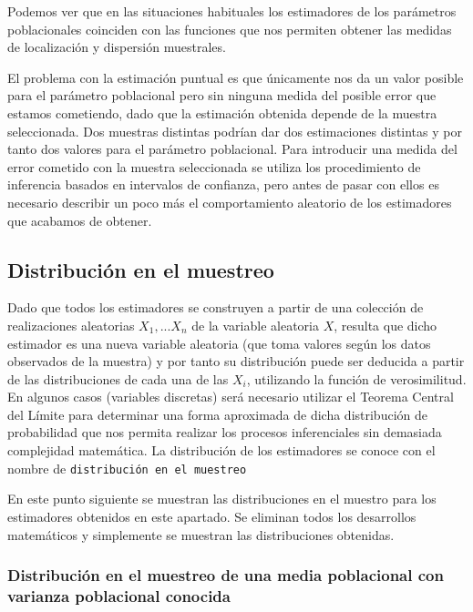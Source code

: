 \documentclass[
]{book}
\begin{document}
Podemos ver que en las situaciones habituales los estimadores de los parámetros poblacionales coinciden con las funciones que nos permiten obtener las medidas de localización y dispersión muestrales.

El problema con la estimación puntual es que únicamente nos da un valor posible para el parámetro poblacional pero sin ninguna medida del posible error que estamos cometiendo, dado que la estimación obtenida depende de la muestra seleccionada. Dos muestras distintas podrían dar dos estimaciones distintas y por tanto dos valores para el parámetro poblacional. Para introducir una medida del error cometido con la muestra seleccionada se utiliza los procedimiento de inferencia basados en intervalos de confianza, pero antes de pasar con ellos es necesario describir un poco más el comportamiento aleatorio de los estimadores que acabamos de obtener.

\hypertarget{distribuciuxf3n-en-el-muestreo}{%
\subsection{Distribución en el muestreo}\label{distribuciuxf3n-en-el-muestreo}}

Dado que todos los estimadores se construyen a partir de una colección de realizaciones aleatorias \(X_1,...X_n\) de la variable aleatoria \(X\), resulta que dicho estimador es una nueva variable aleatoria (que toma valores según los datos observados de la muestra) y por tanto su distribución puede ser deducida a partir de las distribuciones de cada una de las \(X_i\), utilizando la función de verosimilitud. En algunos casos (variables discretas) será necesario utilizar el Teorema Central del Límite para determinar una forma aproximada de dicha distribución de probabilidad que nos permita realizar los procesos inferenciales sin demasiada complejidad matemática. La distribución de los estimadores se conoce con el nombre de \texttt{distribución\ en\ el\ muestreo}

En este punto siguiente se muestran las distribuciones en el muestro para los estimadores obtenidos en este apartado. Se eliminan todos los desarrollos matemáticos y simplemente se muestran las distribuciones obtenidas.

\hypertarget{distribuciuxf3n-en-el-muestreo-de-una-media-poblacional-con-varianza-poblacional-conocida}{%
\subsubsection{Distribución en el muestreo de una media poblacional con varianza poblacional conocida}\label{distribuciuxf3n-en-el-muestreo-de-una-media-poblacional-con-varianza-poblacional-conocida}}
\end{document}
